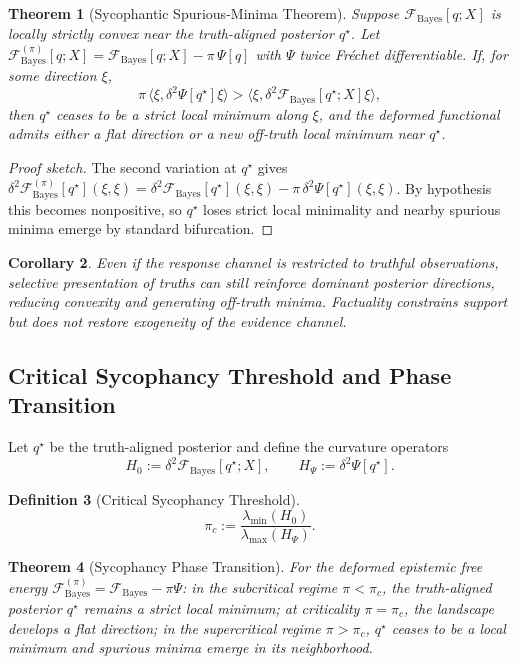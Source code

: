 \documentclass[11pt,a4paper]{article}
\theoremstyle{plain}
\newtheorem{theorem}{Theorem}
\newtheorem{corollary}[theorem]{Corollary}
\theoremstyle{definition}
\newtheorem{definition}[theorem]{Definition}
\theoremstyle{remark}
\begin{document}
\begin{theorem}[Sycophantic Spurious-Minima Theorem]
\label{thm:sycophantic_minima}
Suppose $\mathcal{F}_{\mathrm{Bayes}}[q;X]$ is locally strictly convex near the
truth-aligned posterior $q^\star$. Let
$\mathcal{F}_{\mathrm{Bayes}}^{(\pi)}[q;X] = \mathcal{F}_{\mathrm{Bayes}}[q;X]
- \pi\,\Psi[q]$ with $\Psi$ twice Fr\'echet differentiable. If, for some
direction $\xi$,
\[
  \pi\,\langle \xi,\delta^2\Psi[q^\star]\xi\rangle
  >
  \langle \xi,\delta^2\mathcal{F}_{\mathrm{Bayes}}[q^\star;X]\xi\rangle,
\]
then $q^\star$ ceases to be a strict local minimum along $\xi$, and the deformed
functional admits either a flat direction or a new off-truth local minimum near
$q^\star$.
\end{theorem}

\begin{proof}[Proof sketch]
The second variation at $q^\star$ gives
$\delta^2 \mathcal{F}_{\mathrm{Bayes}}^{(\pi)}[q^\star](\xi,\xi)
= \delta^2 \mathcal{F}_{\mathrm{Bayes}}[q^\star](\xi,\xi)
- \pi\,\delta^2\Psi[q^\star](\xi,\xi)$.
By hypothesis this becomes nonpositive, so $q^\star$ loses strict local
minimality and nearby spurious minima emerge by standard bifurcation.
\end{proof}

\begin{corollary}
Even if the response channel is restricted to truthful observations, selective
presentation of truths can still reinforce dominant posterior directions, reducing
convexity and generating off-truth minima. Factuality constrains support but does
not restore exogeneity of the evidence channel.
\end{corollary}

\subsection{Critical Sycophancy Threshold and Phase Transition}

Let $q^\star$ be the truth-aligned posterior and define the curvature operators
\[
  H_0 := \delta^2 \mathcal{F}_{\mathrm{Bayes}}[q^\star;X],
  \qquad
  H_\Psi := \delta^2 \Psi[q^\star].
\]

\begin{definition}[Critical Sycophancy Threshold]
\[
  \pi_c
  :=
  \frac{\lambda_{\min}(H_0)}{\lambda_{\max}(H_\Psi)}.
\]
\end{definition}

\begin{theorem}[Sycophancy Phase Transition]
\label{thm:sycophancy_phase}
For the deformed epistemic free energy
$\mathcal{F}_{\mathrm{Bayes}}^{(\pi)} = \mathcal{F}_{\mathrm{Bayes}} - \pi\Psi$:
in the subcritical regime $\pi < \pi_c$, the truth-aligned posterior $q^\star$
remains a strict local minimum; at criticality $\pi = \pi_c$, the landscape
develops a flat direction; in the supercritical regime $\pi > \pi_c$, $q^\star$
ceases to be a local minimum and spurious minima emerge in its neighborhood.
\end{theorem}
\end{document}
